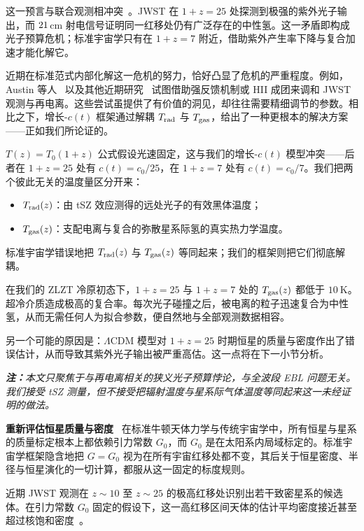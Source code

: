 \documentclass[12pt,leqno]{article}
\newcommand{\tinysp}{\mspace{1.5mu}}
\begin{document}
	\medskip
	这一预言与联合观测相冲突~\cite{Madau:2023}。JWST 在 $1+z=25$ 处探测到极强的紫外光子输出，而 $21\tinysp$cm 射电信号证明同一红移处仍有广泛存在的中性氢。这一矛盾即构成光子预算危机；标准宇宙学只有在 $1+z=7$ 附近，借助紫外产生率下降与复合加速才能化解它。 
	
	\medskip
	近期在标准范式内部化解这一危机的努力，恰好凸显了危机的严重程度。例如，Austin 等人~\cite{Austin:2025} 以及其他近期研究~\cite{Reionization:2025} 试图借助强反馈机制或 HII 成团来调和 JWST 观测与再电离。这些尝试虽提供了有价值的洞见，却往往需要精细调节的参数。相比之下，增长-\(c(t)\) 框架通过解耦 \(T_{\rm rad}\) 与 \(T_{\rm gas}\)，给出了一种更根本的解决方案——正如我们所论证的。
	
	\medskip
	$T(z)=T_0(1+z)$ 公式假设光速固定，这与我们的增长-$c(t)$ 模型冲突——后者在 $1+z=25$ 处有 $c(t)=c_0/25$，在 $1+z=7$ 处有 $c(t)=c_0/7$。我们把两个彼此无关的温度量区分开来：
	\begin{itemize}
		\item $T_{\rm rad}(z)$：由 tSZ 效应测得的远处光子的有效黑体温度；
		\item $T_{\rm gas}(z)$：支配电离与复合的弥散星系际氢的真实热力学温度。
	\end{itemize}
	
	标准宇宙学错误地把 $T_{\rm rad}(z)$ 与 $T_{\rm gas}(z)$ 等同起来；我们的框架则把它们彻底解耦。
	
	\medskip
	在我们的 ZLZT 冷原初态下，$1+z=25$ 与 $1+z=7$ 处的 $T_{\rm gas}(z)$ 都低于 $10\ \mathrm{K}$。超冷介质造成极高的复合率。每次光子碰撞之后，被电离的粒子迅速复合为中性氢，从而无需任何人为拟合参数，便自然地与全部观测数据相容。 
	
	\medskip
	另一个可能的原因是：$\Lambda$CDM 模型对 $1+z=25$ 时期恒星的质量与密度作出了错误估计，从而导致其紫外光子输出被严重高估。这一点将在下一小节分析。
	
	\medskip
	\textit{\textbf{注：}本文只聚焦于与再电离相关的狭义光子预算悖论，与全波段 EBL 问题无关。我们接受 tSZ 测量，但不接受把辐射温度与星系际气体温度等同起来这一未经证明的做法。}
	
	
	\medskip
	\bigskip
	\textbf{重新评估恒星质量与密度}\,\,\,
	在标准牛顿天体力学与传统宇宙学中，所有恒星与星系的质量标定根本上都依赖引力常数 $G_0$，而 $G_0$ 是在太阳系内局域标定的。标准宇宙学框架隐含地把 $G=G_0$ 视为在所有宇宙红移处都不变，其后关于恒星密度、半径与恒星演化的一切计算，都服从这一固定的标度规则。
	
	\medskip
	近期 JWST 观测在 $z\sim10$ 至 $z\sim25$ 的极高红移处识别出若干致密星系的候选体。在引力常数 $G_0$ 固定的假设下，这一高红移区间天体的估计平均密度接近甚至超过核饱和密度~\cite{Labbe:2023}。
	
\end{document}
